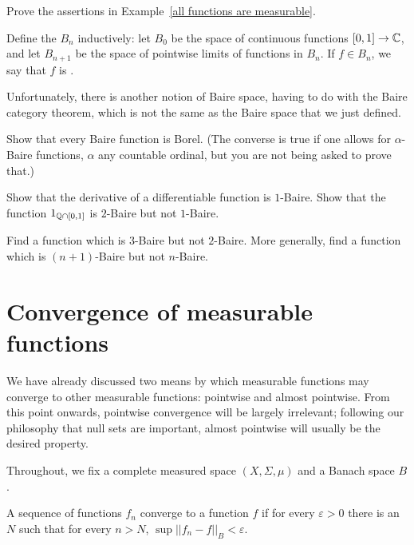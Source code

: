 \begin{exercise}
\label{all functions are measurable exer}
Prove the assertions in Example~\ref{all functions are measurable}.
\end{exercise}

\begin{definition}
Define the  $B_{n}$ inductively: let $B_0$ be the space of continuous functions $[0, 1] \to \mathbb{C}$, and let $B_{n+1}$ be the space of pointwise limits of functions in $B_{n}$.
If $f \in B_{n}$, we say that $f$ is .

Unfortunately, there is another notion of Baire space, having to do with the Baire category theorem, which is not the same as the Baire space that we just defined.
\end{definition}

\begin{exercise}
Show that every Baire function is Borel.
(The converse is true if one allows for $\alpha$-Baire functions, $\alpha$ any countable ordinal, but you are not being asked to prove that.)
\end{exercise}

\begin{exercise}
Show that the derivative of a differentiable function is $1$-Baire.
Show that the function $1_{\mathbb{Q} \cap [0, 1]}$ is $2$-Baire but not $1$-Baire.
\end{exercise}

\begin{exercise}
Find a function which is $3$-Baire but not $2$-Baire. More generally, find a function which is $(n+1)$-Baire but not $n$-Baire.
\end{exercise}

\section{Convergence of measurable functions}
We have already discussed two means by which measurable functions may converge to other measurable functions: pointwise and almost pointwise.
From this point onwards, pointwise convergence will be largely irrelevant; following our philosophy that null sets are important, almost pointwise will usually be the desired property.

\begin{subsec}
Throughout, we fix a complete measured space $(X, \Sigma, \mu)$ and a Banach space $B$.
\end{subsec}

\begin{definition}
A sequence of functions $f_{n}$ converge to a function $f$  if for every $\varepsilon > 0$ there is an $N$ such that for every $n > N$, $\sup ||f_{n} - f||_{B} < \varepsilon$.
\end{definition}

